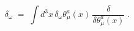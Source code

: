 \begin{equation}
\delta_\omega \;=\; \int d^3x \, \delta_\omega \theta_\mu^a(x) \, 
\frac{\delta}{\delta \theta_\mu^a(x)} \;.
\end{equation}

